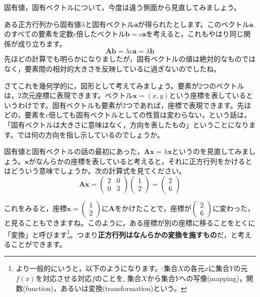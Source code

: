 \documentclass{ltjsbook}
\begin{document}
固有値，固有ベクトルについて，今度は違う側面から見直してみましょう。

ある正方行列から固有値$\lambda$と固有ベクトル$\bm{a}$が得られたとします。このベクトル$\bm{a}$のすべての要素を定数$c$倍したベクトル$\bm{b}=c\bm{a}$を考えると，これもやはり同じ関係が成り立ちます。
\begin{equation}
	\bm{A}\bm{b}=  \lambda c \bm{a} =\lambda \bm{b}
\end{equation}
先ほどの計算でも明らかになりましたが，固有ベクトルの値は絶対的なものではなく，要素間の相対的大きさを反映しているに過ぎないのでしたね。

さてこれを幾何学的に，図形として考えてみましょう。要素が2つのベクトルは，2次元座標に表現できます。ベクトル$\bm{x}=(x,y)$という座標を表しているというわけです。固有ベクトルも要素が2つであれば，座標で表現できます。先ほどの，要素を$c$倍しても固有ベクトルとしての性質は変わらない，という話は，「固有ベクトルは大きさに意味はなく，方向を表したもの」ということになります。では何の方向を指し示しているのでしょうか。

固有値と固有ベクトルの話の最初にあった，$\bm{Ax}=\lambda\bm{x}$というのを見直してみましょう。$\bm{x}$がなんらかの座標を表していると考えると，それに正方行列をかけるとはどういう意味でしょうか。次の計算式を見てください。
\begin{equation}
	\bm{Ax}=
	\begin{pmatrix}
		2 & 0 \\
		0 & 3
	\end{pmatrix}
	\begin{pmatrix}
		1 \\
		2
	\end{pmatrix}
	=
	\begin{pmatrix}
		2 \\
		6
	\end{pmatrix}
\end{equation}

これをみると，座標$\bm{x}=\begin{pmatrix}1\\2\end{pmatrix}$に$\bm{A}$をかけたことで，座標が$\begin{pmatrix}2\\6\end{pmatrix}$に変わった，と見ることもできますね。このように，ある座標が別の座標に移ることをとくに「変換」と呼びます\footnote{より一般的にいうと，以下のようになります。:集合$X$の各元$x$に集合$Y$の元$f(x)$を対応させる対応$f$のことを, 集合$X$から集合$Y$への写像(mapping)，関数(function)，あるいは変換(transformation)という。}。つまり\textbf{正方行列はなんらかの変換を施すもの}だ，と考えることができます。
\end{document}
